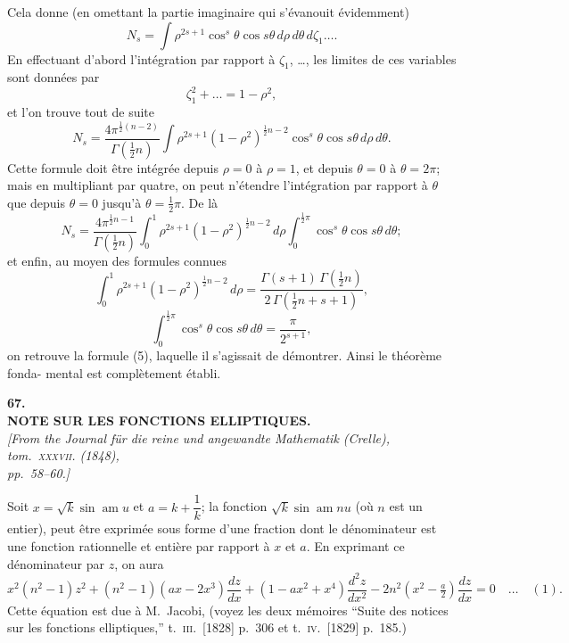 \documentclass[11pt]{article}
\begin{document}

Cela donne (en omettant la partie imaginaire qui s'\'evanouit \'evidemment)
\[
N_{s} = \int\!\rho^{2s + 1}\cos^{s}\theta\cos s\theta\,d\rho\,d\theta\,d\zeta_{1}\ldots.
\]
En effectuant d'abord l'int\'egration par rapport \`a $\zeta_{1}$, \ldots, les limites de ces variables sont
donn\'ees par
\[
\zeta_{1}^{2} + \ldots = 1 - \rho^{2},
\]
et l'on trouve tout de suite
\[
N_{s} = \frac{4\pi^{\tfrac{1}{2}(n - 2)}}{\Gamma(\tfrac{1}{2}n)}\!\int\!\rho^{2s + 1}(1 - \rho^{2})^{\tfrac{1}{2}n - 2}\cos^{s}\theta\cos s\theta\,d\rho\,d\theta.
\]
Cette formule doit \^etre int\'egr\'ee depuis $\rho = 0$ \`a $\rho = 1$, et depuis $\theta = 0$ \`a $\theta = 2\pi$; mais en
multipliant par quatre, on peut n'\'etendre l'int\'egration par rapport \`a $\theta$ que depuis $\theta = 0$
jusqu'\`a $\theta = \tfrac{1}{2}\pi$. De l\`a
\[
N_{s} = \frac{4\pi^{\tfrac{1}{2}n - 1}}{\Gamma(\tfrac{1}{2}n)}\!\int_{0}^{1}\!\rho^{2s + 1}(1 - \rho^{2})^{\tfrac{1}{2}n - 2}\,d\rho\!\int_{0}^{\tfrac{1}{2}\pi}\!\cos^{s}\theta\cos s\theta\,d\theta;
\]
et enfin, au moyen des formules connues
\[
\int_{0}^{1}\!\rho^{2s + 1}(1 - \rho^{2})^{\tfrac{1}{2}n - 2}\,d\rho = \frac{\Gamma(s + 1)\,\Gamma(\tfrac{1}{2}n)}{2\,\Gamma(\tfrac{1}{2}n + s + 1)},
\]
\[
\int_{0}^{\tfrac{1}{2}\pi}\!\cos^{s}\theta\cos s\theta\,d\theta = \frac{\pi}{2^{s + 1}},
\]
on retrouve la formule (5), laquelle il s'agissait de d\'emontrer. Ainsi le th\'eor\`eme fonda-
mental est compl\`etement \'etabli.

\bigskip

\begin{center}
\textbf{\large 67.}\\[0.7em]
\textbf{\large NOTE SUR LES FONCTIONS ELLIPTIQUES.}\\[0.5em]
\textit{[From the Journal f\"ur die reine und angewandte Mathematik (Crelle), tom.~\textsc{xxxvii}. (1848),\\
pp.~58--60.]}
\end{center}

\medskip

Soit $x = \sqrt{k}\sin\operatorname{am} u$ et $a = k + \dfrac{1}{k}$; la fonction $\sqrt{k}\sin\operatorname{am} nu$ (o\`u $n$ est un entier),
peut \^etre exprim\'ee sous forme d'une fraction dont le d\'enominateur est une fonction
rationnelle et enti\`ere par rapport \`a $x$ et $a$. En exprimant ce d\'enominateur par $z$, on
aura
\[
x^{2}(n^{2} - 1)z^{2} + (n^{2} - 1)(ax - 2x^{3})\frac{dz}{dx} + (1 - ax^{2} + x^{4})\frac{d^{2}z}{dx^{2}} - 2n^{2}(x^{2} - \tfrac{a}{2})\frac{dz}{dx} = 0\quad\ldots\quad (1).
\]
Cette \'equation est due \`a M.~Jacobi, (voyez les deux m\'emoires ``Suite des notices sur
les fonctions elliptiques,'' t.~\textsc{iii}.\ [1828] p.~306 et t.~\textsc{iv}.\ [1829] p.~185.)
\end{document}
